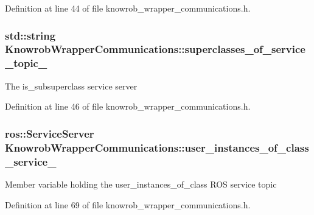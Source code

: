 Definition at line 44 of file knowrob\-\_\-wrapper\-\_\-communications.\-h.

\hypertarget{classKnowrobWrapperCommunications_aeed7bc627032586a30f7405ed7450dc2}{
\subsubsection[{superclasses\-\_\-of\-\_\-service\-\_\-topic\-\_\-}]{\setlength{\rightskip}{0pt plus 5cm}std\-::string Knowrob\-Wrapper\-Communications\-::superclasses\-\_\-of\-\_\-service\-\_\-topic\-\_\-\hspace{0.3cm}{\ttfamily [private]}}}\label{classKnowrobWrapperCommunications_aeed7bc627032586a30f7405ed7450dc2}
The is\-\_\-subsuperclass service server 

Definition at line 46 of file knowrob\-\_\-wrapper\-\_\-communications.\-h.

\hypertarget{classKnowrobWrapperCommunications_a135ffaafe3229f5208de0622430fa9b6}{
\subsubsection[{user\-\_\-instances\-\_\-of\-\_\-class\-\_\-service\-\_\-}]{\setlength{\rightskip}{0pt plus 5cm}ros\-::\-Service\-Server Knowrob\-Wrapper\-Communications\-::user\-\_\-instances\-\_\-of\-\_\-class\-\_\-service\-\_\-\hspace{0.3cm}{\ttfamily [private]}}}\label{classKnowrobWrapperCommunications_a135ffaafe3229f5208de0622430fa9b6}
Member variable holding the user\-\_\-instances\-\_\-of\-\_\-class R\-O\-S service topic 

Definition at line 69 of file knowrob\-\_\-wrapper\-\_\-communications.\-h.

